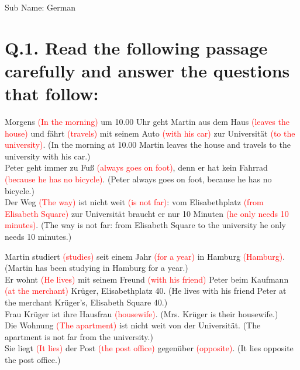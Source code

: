 \documentclass{article}
\title{}
\date{Mid-Spring Semester 2015-2016}
\begin{document}
\maketitle

\noindent
Sub Name: German \\


\section*{Q.1. Read the following passage carefully and answer the questions that follow:}

Morgens \textcolor{red}{(In the morning)} um 10.00 Uhr geht Martin aus dem Haus \textcolor{red}{(leaves the house)} und fährt \textcolor{red}{(travels)} mit seinem Auto \textcolor{red}{(with his car)} zur Universität \textcolor{red}{(to the university)}. (In the morning at 10.00 Martin leaves the house and travels to the university with his car.)\\
Peter geht immer zu Fuß \textcolor{red}{(always goes on foot)}, denn er hat kein Fahrrad \textcolor{red}{(because he has no bicycle)}. (Peter always goes on foot, because he has no bicycle.)\\
Der Weg \textcolor{red}{(The way)} ist nicht weit \textcolor{red}{(is not far)}: vom Elisabethplatz \textcolor{red}{(from Elisabeth Square)} zur Universität braucht er nur 10 Minuten \textcolor{red}{(he only needs 10 minutes)}. (The way is not far: from Elisabeth Square to the university he only needs 10 minutes.)

Martin studiert \textcolor{red}{(studies)} seit einem Jahr \textcolor{red}{(for a year)} in Hamburg \textcolor{red}{(Hamburg)}. (Martin has been studying in Hamburg for a year.)\\
Er wohnt \textcolor{red}{(He lives)} mit seinem Freund \textcolor{red}{(with his friend)} Peter beim Kaufmann \textcolor{red}{(at the merchant)} Krüger, Elisabethplatz 40. (He lives with his friend Peter at the merchant Krüger's, Elisabeth Square 40.)\\
Frau Krüger ist ihre Hausfrau \textcolor{red}{(housewife)}. (Mrs. Krüger is their housewife.)\\
Die Wohnung \textcolor{red}{(The apartment)} ist nicht weit von der Universität. (The apartment is not far from the university.)\\
Sie liegt \textcolor{red}{(It lies)} der Post \textcolor{red}{(the post office)} gegenüber \textcolor{red}{(opposite)}. (It lies opposite the post office.)
\end{document}
